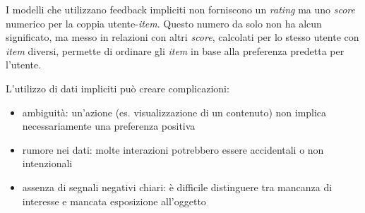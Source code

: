I modelli che utilizzano feedback impliciti non forniscono un \textit{rating} ma uno \textit{score} numerico per la coppia utente-\textit{item}. Questo numero da solo non ha alcun significato, ma messo in relazioni con altri \textit{score}, calcolati per lo stesso utente con \textit{item} diversi, permette di ordinare gli \textit{item} in base alla preferenza predetta per l'utente.

L'utilizzo di dati impliciti può creare complicazioni:

\begin{itemize}
    \item ambiguità: un'azione (es. visualizzazione di un contenuto) non implica necessariamente una preferenza positiva
    \item rumore nei dati: molte interazioni potrebbero essere accidentali o non intenzionali
    \item assenza di segnali negativi chiari: è difficile distinguere tra mancanza di interesse e mancata esposizione all'oggetto
\end{itemize}
